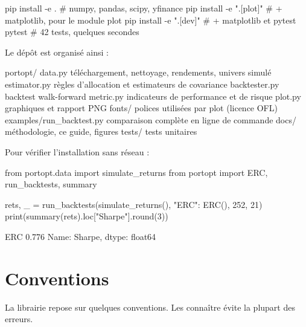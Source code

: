 \documentclass[11pt,a4paper]{article}
\begin{document}
\begin{shell}
pip install -e .              # numpy, pandas, scipy, yfinance
pip install -e ".[plot]"      # + matplotlib, pour le module plot
pip install -e ".[dev]"       # + matplotlib et pytest
pytest                        # 42 tests, quelques secondes
\end{shell}

Le dépôt est organisé ainsi :

\begin{pyout}
portopt/
  data.py          téléchargement, nettoyage, rendements, univers simulé
  estimator.py     règles d'allocation et estimateurs de covariance
  backtester.py    backtest walk-forward
  metric.py        indicateurs de performance et de risque
  plot.py          graphiques et rapport PNG
  fonts/           polices utilisées par plot (licence OFL)
examples/run_backtest.py   comparaison complète en ligne de commande
docs/                      méthodologie, ce guide, figures
tests/                     tests unitaires
\end{pyout}

Pour vérifier l'installation sans réseau :

\begin{python}
from portopt.data import simulate_returns
from portopt import ERC, run_backtests, summary

rets, _ = run_backtests(simulate_returns(), {"ERC": ERC()}, 252, 21)
print(summary(rets).loc["Sharpe"].round(3))
\end{python}
\begin{pyout}
ERC    0.776
Name: Sharpe, dtype: float64
\end{pyout}

\section{Conventions}\label{sec:conv}

La librairie repose sur quelques conventions. Les connaître évite la plupart des erreurs.
\end{document}
